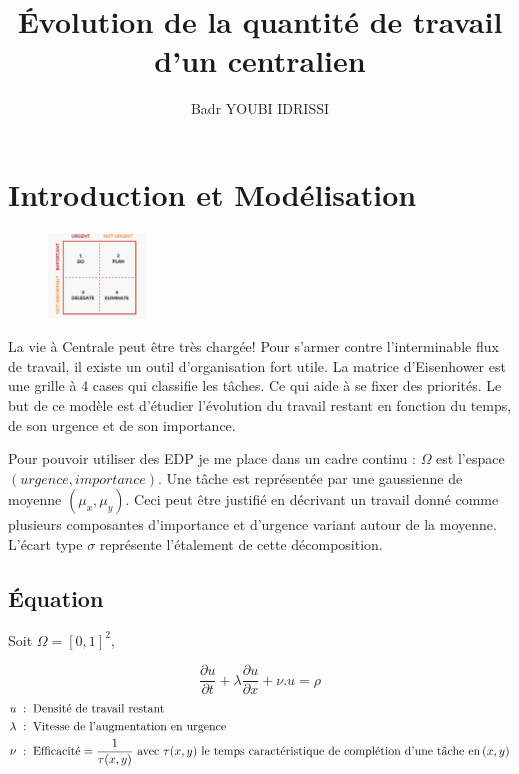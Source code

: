 \documentclass[french]{article}
\author{Badr YOUBI IDRISSI}
\title{\'Evolution de la quantité de travail d'un centralien}
\begin{document}
\maketitle
\section{Introduction et Modélisation}

    \begin{figure}
        \begin{center}
            \includegraphics[width=0.23\textwidth]{Figures/Eisenhower.png}
        \end{center}
    \end{figure}
    La vie à Centrale peut être très chargée! Pour s'armer contre l'interminable 
    flux de travail, il existe un outil d'organisation fort utile.
    La matrice d'Eisenhower est une grille à 4 cases qui classifie les tâches. Ce qui 
    aide à se fixer des priorités. Le but de ce modèle est d'étudier
    l'évolution du travail restant en fonction du temps, de son urgence et de son importance.
    
    Pour pouvoir utiliser des EDP je me place dans un cadre continu : $\Omega$ est
     l'espace $(urgence, importance)$. Une tâche est représentée par 
    une gaussienne de moyenne $(\mu_x,\mu_y)$.
    Ceci peut être justifié en décrivant un travail donné comme plusieurs composantes
     d'importance et d'urgence variant
    autour de la moyenne. L'écart type $\sigma$ représente l'étalement de cette décomposition.

    \subsection{\'Equation}
    Soit $\Omega = [0,1]^2$,
    
    \begin{equation}\label{EDP}
        \frac{\partial u}{\partial t} + \lambda\frac{\partial u}{\partial x} + \nu.u = \rho 
    \end{equation}
    \begin{alignat*}{6}
        u \;:\; &\text{\;Densité de travail restant} \\
        \lambda \;:\; &\text{\;Vitesse de l'augmentation en urgence}\\
        \nu \;:\; &
        \text{\;Efficacité} = \frac{1}{\tau(x,y)} \text{ avec } \tau(x,y) 
        \text{ le temps caractéristique de complétion d'une tâche en} \,(x,y)
    \end{alignat*}
\end{document}
